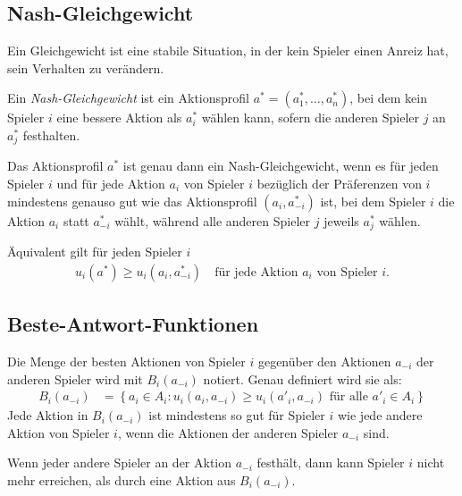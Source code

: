 \subsection{Nash-Gleichgewicht}%
\label{sub:nash_gleichgewicht}

Ein Gleichgewicht ist eine stabile Situation, in der kein Spieler einen Anreiz hat, sein
Verhalten zu verändern.

Ein \emph{Nash-Gleichgewicht} ist ein Aktionsprofil $a^* = (a^*_1, \ldots, a^*_n)$,
bei dem kein Spieler $i$ eine bessere Aktion als $a^*_i$ wählen kann,
sofern die anderen Spieler $j$ an $a^*_j$ festhalten.

\begin{definition}
  Das Aktionsprofil $a^*$ ist genau dann ein Nash-Gleichgewicht,
  wenn es für jeden Spieler $i$ und für jede Aktion $a_i$ von Spieler $i$
  bezüglich der Präferenzen von $i$
  mindestens genauso gut wie das Aktionsprofil $(a_i, a^*_{-i})$ ist,
  bei dem Spieler $i$ die Aktion $a_i$ statt $a^*_{-i}$ wählt,
  während alle anderen Spieler $j$ jeweils $a^*_j$ wählen.

  Äquivalent gilt für jeden Spieler $i$
  \begin{align*}
    u_i(a^*) \geq u_i(a_i, a^*_{-i}) \quad \text{für jede Aktion $a_i$ von Spieler $i$.}
  \end{align*}
\end{definition}

\subsection{Beste-Antwort-Funktionen}%
\label{sub:beste_antwort_funktionen}

\begin{definition}
  Die Menge der besten Aktionen von Spieler $i$ gegenüber den Aktionen $a_{-i}$ der
  anderen Spieler wird mit $B_i(a_{-i})$ notiert.
  Genau definiert wird sie als:
  \begin{align*}
    B_i(a_{-i}) & = \left\{
      a_i \in A_i :
      u_i(a_i, a_{-i}) \geq u_i(a'_i, a_{-i})
      \text{ für alle $a'_i \in A_i$}
    \right\}
  \end{align*}
  Jede Aktion in $B_i(a_{-i})$ ist mindestens so gut für Spieler $i$ wie jede andere
  Aktion von Spieler $i$, wenn die Aktionen der anderen Spieler $a_{-i}$ sind.

  Wenn jeder andere Spieler an der Aktion $a_{-i}$ festhält, dann kann Spieler $i$ nicht
  mehr erreichen, als durch eine Aktion aus $B_i(a_{-i})$.
\end{definition}

